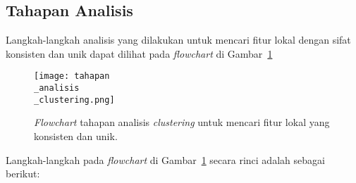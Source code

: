 \subsection{Tahapan Analisis}
\label{subsec:tahapan_analisis_clustering}
Langkah-langkah analisis yang dilakukan untuk mencari fitur lokal dengan sifat konsisten dan unik dapat dilihat pada \textit{flowchart} di Gambar~\ref{fig:tahapan_analisis_clustering}
\begin{figure}[H]
	\centering
	\texttt{[image: tahapan\\\_analisis\\\_clustering.png]}
	\caption{\textit{Flowchart} tahapan analisis \textit{clustering} untuk mencari fitur lokal yang konsisten dan unik.}
	\label{fig:tahapan_analisis_clustering}
\end{figure}

Langkah-langkah pada \textit{flowchart} di Gambar~\ref{fig:tahapan_analisis_clustering} secara rinci adalah sebagai berikut:
